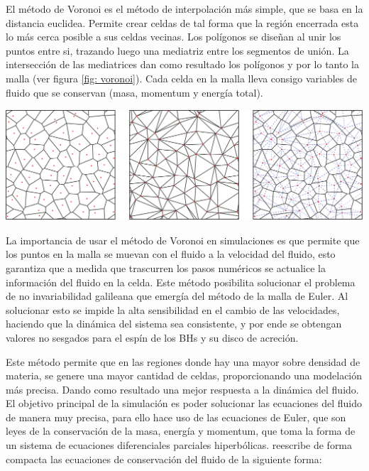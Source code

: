El método de Voronoi es el método de interpolación más simple, que se basa en la distancia euclidea. Permite crear celdas de tal forma que la región encerrada esta lo más cerca posible a sus celdas vecinas. Los polígonos se diseñan al unir los puntos entre si, trazando luego una mediatriz entre los segmentos de unión. La intersección de las mediatrices dan como resultado los polígonos y por lo tanto la malla (ver figura \ref{fig: voronoi}). Cada celda en la malla lleva consigo variables de fluido que se conservan (masa, momentum y energía total).
%
\begin{center}
\includegraphics[scale=.35]{./figures/5_Algoritmo_Modelacion/voronoi.png}
\label{fig: voronoi}
\end{center}
%
La importancia de usar el método de Voronoi en simulaciones  es que permite que los puntos en la malla se muevan con el fluido a la velocidad del fluido, esto garantiza que a medida que trascurren los pasos numéricos se actualice la información del fluido en la celda. Este método posibilita solucionar el problema de no invariabilidad galileana que emergía del método de la malla de Euler. Al solucionar esto se impide la alta sensibilidad en el cambio de las velocidades, haciendo que la dinámica del sistema sea consistente, y por ende se obtengan valores no sesgados para  el espín de los BHs y su disco de acreción.  

Este método permite que en las regiones donde hay una mayor sobre densidad de materia, se genere una mayor cantidad de celdas, proporcionando una modelación más precisa. Dando como resultado una mejor respuesta a la dinámica del fluido.
El objetivo principal de la simulación es poder solucionar las ecuaciones del fluido de manera muy precisa, para ello hace uso de las ecuaciones de Euler, que son leyes de la conservación de la masa, energía y momentum, que toma la forma de un sistema de ecuaciones diferenciales parciales hiperbólicas. \cite{springel2010} reescribe de forma compacta las ecuaciones de conservación del fluido de la siguiente forma:

